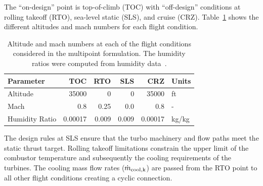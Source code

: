 \documentclass[conf]{new-aiaa}
\begin{document}
The ``on-design'' point is top-of-climb (TOC) with ``off-design'' conditions at rolling takeoff (RTO), sea-level static (SLS), and cruise (CRZ).
Table~\ref{tab:flight_conds} shows the different altitudes and mach numbers for each flight condition.
\begin{table}[hbt!]
    \centering
    \caption{Altitude and mach numbers at each of the flight conditions considered in the multipoint formulation.
        The humidity ratios were computed from humidity data~\cite{Kalnay1996}.
    }
    \begin{tabular}{l r r r r l}
        \hline
        Parameter      & TOC     & RTO   & SLS   & CRZ     & Units      \\
        \hline
        Altitude       & 35000   & 0     & 0     & 35000   & \si{ft}    \\
        Mach           & 0.8     & 0.25  & 0.0   & 0.8     & -          \\
        Humidity Ratio & 0.00017 & 0.009 & 0.009 & 0.00017 & \si{kg/kg} \\
        \hline
    \end{tabular}
    \label{tab:flight_conds}
\end{table}
The design rules at SLS ensure that the turbo machinery and flow paths meet the static thrust target.
Rolling takeoff limitations constrain the upper limit of the combustor temperature and subsequently the cooling requirements of the turbines.
The cooling mass flow rates ($\dot{m}_{\rm{cool},k}$) are passed from the RTO point to all other flight conditions creating a cyclic connection.
\end{document}
